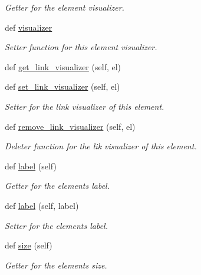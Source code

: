 \begin{DoxyCompactItemize}
\begin{DoxyCompactList}\small\item\em Getter for the element visualizer. \end{DoxyCompactList}\item 
def \mbox{\hyperlink{classbridges_1_1element_1_1_element_a38aad89ce4b1e01cb9f548cac4313077}{visualizer}}
\begin{DoxyCompactList}\small\item\em Setter function for this element visualizer. \end{DoxyCompactList}\item 
def \mbox{\hyperlink{classbridges_1_1element_1_1_element_af04537af8ad9f64047de96a524c8c1f9}{get\+\_\+link\+\_\+visualizer}} (self, el)
\item 
def \mbox{\hyperlink{classbridges_1_1element_1_1_element_afe94604116e0dec9a60a4ea54a462323}{set\+\_\+link\+\_\+visualizer}} (self, el)
\begin{DoxyCompactList}\small\item\em Setter for the link visualizer of this element. \end{DoxyCompactList}\item 
def \mbox{\hyperlink{classbridges_1_1element_1_1_element_ad2aff75ace2a306deff639b4aa129ce0}{remove\+\_\+link\+\_\+visualizer}} (self, el)
\begin{DoxyCompactList}\small\item\em Deleter function for the lik visualizer of this element. \end{DoxyCompactList}\item 
def \mbox{\hyperlink{classbridges_1_1element_1_1_element_a3cd2f535bb7993254b8d255cb0166062}{label}} (self)
\begin{DoxyCompactList}\small\item\em Getter for the element\textquotesingle{}s label. \end{DoxyCompactList}\item 
def \mbox{\hyperlink{classbridges_1_1element_1_1_element_a29dd33558e94464186658d2baad1d6c9}{label}} (self, label)
\begin{DoxyCompactList}\small\item\em Setter for the element\textquotesingle{}s label. \end{DoxyCompactList}\item 
def \mbox{\hyperlink{classbridges_1_1element_1_1_element_a4d25b09a11a282c8c8147b16cd45c5bf}{size}} (self)
\begin{DoxyCompactList}\small\item\em Getter for the element\textquotesingle{}s size. \end{DoxyCompactList}\item 

\end{DoxyCompactItemize}
